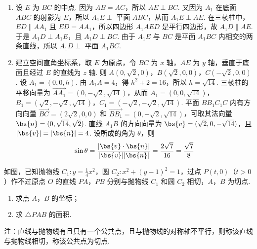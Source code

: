 \begin{solution}
\begin{enumerate}
\item 设 \(E\) 为 \(BC\) 的中点. 因为 \(AB=AC\)，所以 \(AE\perp BC\). 又因为 \(A_1\) 在底面 \(ABC\) 的射影为 \(E\)，所以 \(A_1E\perp\) 平面 \(ABC\)，从而 \(A_1E\perp AE\). 在三棱柱中，\(ED\parallel AA_1\) 且 \(ED=AA_1\)，所以四边形 \(A_1AED\) 是平行四边形，故 \(A_1D\parallel AE\). 于是 \(A_1D\perp A_1E\)，且 \(A_1D\perp BC\). 由于 \(A_1E\) 与 \(BC\) 是平面 \(A_1BC\) 内相交的两条直线，所以 \(A_1D\perp\) 平面 \(A_1BC\).

\item 建立空间直角坐标系，取 \(E\) 为原点，令 \(BC\) 为 \(x\) 轴，\(AE\) 为 \(y\) 轴，垂直于底面且经过 \(E\) 的直线为 \(z\) 轴. 则
\(A(0,\sqrt2,0)\)，\(B(\sqrt2,0,0)\)，\(C(-\sqrt2,0,0)\).
设 \(A_1=(0,0,h)\). 由 \(A_1A=4\)，得 \(h^2+2=16\)，所以 \(h=\sqrt{14}\). 三棱柱的平移向量为 \(\overrightarrow{AA_1}=(0,-\sqrt2,\sqrt{14})\)，从而
\(A_1=(0,0,\sqrt{14})\)，\(B_1=(\sqrt2,-\sqrt2,\sqrt{14})\)，\(C_1=(-\sqrt2,-\sqrt2,\sqrt{14})\).
平面 \(BB_1C_1C\) 内有方向向量 \(\overrightarrow{BC}=(2\sqrt2,0,0)\) 和 \(\overrightarrow{BB_1}=(0,-\sqrt2,\sqrt{14})\)，可取其法向量 \(\bs{n}=(0,\sqrt{14},\sqrt2)\). 直线 \(A_1B\) 的方向向量为 \(\bs{v}=(\sqrt2,0,-\sqrt{14})\)，且 \(|\bs{v}|=|\bs{n}|=4\). 设所成的角为 \(\theta\)，则
\[
\sin\theta=\frac{|\bs{v}\cdot\bs{n}|}{|\bs{v}||\bs{n}|}=\frac{2\sqrt7}{16}=\frac{\sqrt7}{8}
\]
\end{enumerate}
\end{solution}

\begin{problem}
如图，已知抛物线 \(C_1:y=\frac{1}{4}x^2\)，圆 \(C_2:x^2+(y-1)^2=1\)，过点 \(P(t,0)\)（\(t>0\)）作不过原点 \(O\) 的直线 \(PA\)，\(PB\) 分别与抛物线 \(C_1\) 和圆 \(C_2\) 相切，\(A\)，\(B\) 为切点.

\begin{enumerate}
\item 求点 \(A\)，\(B\) 的坐标；
\item 求 \(\triangle PAB\) 的面积.
\end{enumerate}

注：直线与抛物线有且只有一个公共点，且与抛物线的对称轴不平行，则称该直线与抛物线相切，称该公共点为切点.

\begingroup
\leftskip=0pt\relax
\rightskip=0pt\relax
{}
\endgroup
\end{problem}

